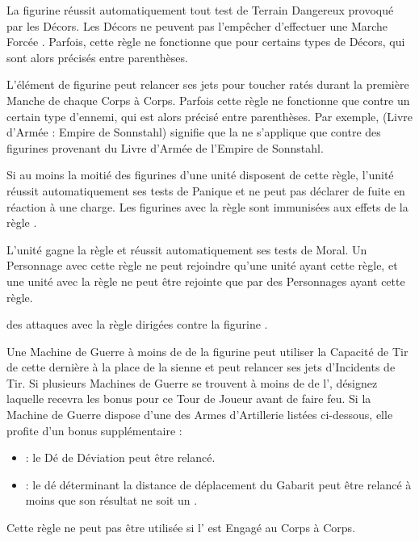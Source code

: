 
La figurine réussit automatiquement tout test de Terrain Dangereux provoqué par les Décors. Les Décors ne peuvent pas l'empêcher d'effectuer une Marche Forcée . Parfois, cette règle ne fonctionne que pour certains types de Décors, qui sont alors précisés entre parenthèses.


L'élément de figurine peut relancer ses jets pour toucher ratés durant la première Manche de chaque Corps à Corps. Parfois cette règle ne fonctionne que contre un certain type d'ennemi, qui est alors précisé entre parenthèses. Par exemple, \og \hatred{} (Livre d'Armée : Empire de Sonnstahl) \fg{} signifie que la \hatred{} ne s'applique que contre des figurines provenant du Livre d'Armée de l'Empire de Sonnstahl.


Si au moins la moitié des figurines d'une unité disposent de cette règle, l'unité réussit automatiquement ses tests de Panique et ne peut pas déclarer de fuite en réaction à une charge. Les figurines avec la règle \immunetopsychology{} sont immunisées aux effets de la règle \fear{}.


L'unité gagne la règle \immunetopsychology{} et réussit automatiquement ses tests de Moral. Un Personnage avec cette règle ne peut rejoindre qu'une unité ayant cette règle, et une unité avec la règle \unbreakable{} ne peut être rejointe que par des Personnages ayant cette règle.


 des attaques avec la règle \flamingattacks{} dirigées contre la figurine .


Une Machine de Guerre à moins de  de la figurine peut utiliser la Capacité de Tir de cette dernière à la place de la sienne et peut relancer ses jets d'Incidents de Tir. Si plusieurs Machines de Guerre se trouvent à moins de  de l'\engineer{}, désignez laquelle recevra les bonus pour ce Tour de Joueur avant de faire feu. Si la Machine de Guerre dispose d'une des Armes d'Artillerie listées ci-dessous, elle profite d'un bonus supplémentaire :
\begin{itemize}[label={\textbullet}]
\item \catapult{} : le Dé de Déviation peut être relancé.
\item \flamethrower{} : le dé déterminant la distance de déplacement du Gabarit peut être relancé à moins que son résultat ne soit un .
\end{itemize}
Cette règle ne peut pas être utilisée si l'\engineer{} est Engagé au Corps à Corps.

